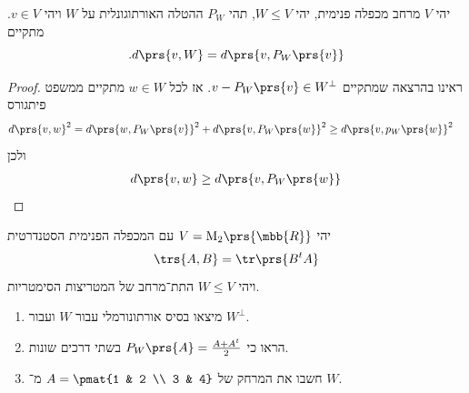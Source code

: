 \documentclass[a4paper,10pt,twoside,openany]{book}
\renewcommand{\Mat}{\mathrm{M}}
\begin{document}
\begin{theorem}
יהי
$V$
מרחב מכפלה פנימית, יהי
$W \leq V$,
תהי
$P_W$
ההטלה האורתוגונלית על
$W$
ויהי
$v \in V$.
מתקיים
\[\text{.} d\prs{v,W} = d\prs{v, P_W\prs{v}}\]
\end{theorem}

\begin{proof}
ראינו בהרצאה שמתקיים
$v - P_W\prs{v} \in W^\perp$.
אז לכל
$w \in W$
מתקיים ממשפט פיתגורס
\begin{align*}
d\prs{v,w}^2 &= d\prs{w, P_W\prs{v}}^2 + d\prs{v, P_W\prs{w}}^2 \geq d\prs{v,p_W\prs{w}}^2
\end{align*}
ולכן
\begin{align*}
d\prs{v,w} \geq d\prs{v, P_W\prs{w}}
\end{align*}
\end{proof}

\begin{exercisechap}
יהי
$V = \Mat_2\prs{\mbb{R}}$
עם המכפלה הפנימית הסטנדרטית
\[\trs{A,B} = \tr\prs{B^t A}\]
ויהי
$W \leq V$
התת־מרחב של המטריצות הסימטריות.

\begin{enumerate}
\item מיצאו בסיס אורתונורמלי עבור
$W$
ועבור
$W^\perp$.

\item
הראו כי
$P_W\prs{A} = \frac{A + A^t}{2}$
בשתי דרכים שונות.

\item
חשבו את המרחק של
$A = \pmat{1 & 2 \\ 3 & 4}$
מ־%
$W$.
\end{enumerate}
\end{exercisechap}
\end{document}
